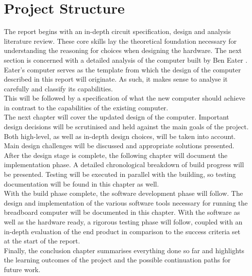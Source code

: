 \documentclass[11pt]{informatics-report}
\begin{document}
\section{Project Structure}
The report begins with an in-depth circuit specification, design and analysis literature review. These core skills lay the theoretical foundation necessary for understanding the reasoning for choices when designing the hardware.
The next section is concerned with a detailed analysis of the computer built by Ben Eater \cite{eater2019breadboard}. Eater's computer serves as the template from which the design of the computer described in this report will originate. As such, it makes sense to analyse it carefully and classify its capabilities. \\
This will be followed by a specification of what the new computer should achieve in contrast to the capabilities of the existing computer. \\
The next chapter will cover the updated design of the computer. Important design decisions will be scrutinised and held against the main goals of the project. Both high-level, as well as in-depth design choices, will be taken into account. Main design challenges will be discussed and appropriate solutions presented. \\
After the design stage is complete, the following chapter will document the implementation phase. A detailed chronological breakdown of build progress will be presented. Testing will be executed in parallel with the building, so testing documentation will be found in this chapter as well. \\
With the build phase complete, the software development phase will follow. The design and implementation of the various software tools necessary for running the breadboard computer will be documented in this chapter.
With the software as well as the hardware ready, a rigorous testing phase will follow, coupled with an in-depth evaluation of the end product in comparison to the success criteria set at the start of the report. \\
Finally, the conclusion chapter summarises everything done so far and highlights the learning outcomes of the project and the possible continuation paths for future work. \\


% 


% 
% 
% 




% 
% 
% 
\end{document}
